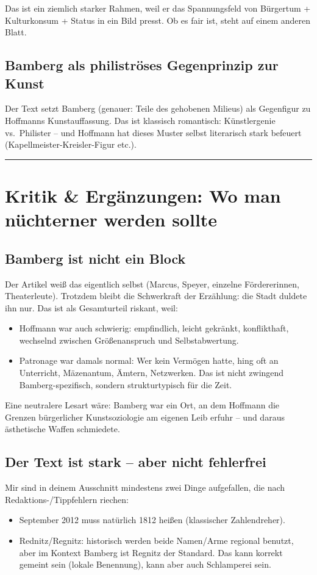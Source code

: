 \documentclass[11pt]{amsart}
\begin{document}
Das ist ein ziemlich starker Rahmen, weil er das Spannungsfeld von B\"urgertum + Kulturkonsum + Status in ein Bild presst. Ob es \glqq fair\grqq{} ist, steht auf einem anderen Blatt.

\subsection{Bamberg als \glqq philistr\"oses\grqq{} Gegenprinzip zur Kunst}
Der Text setzt Bamberg (genauer: Teile des gehobenen Milieus) als Gegenfigur zu Hoffmanns Kunstauffassung. Das ist klassisch romantisch: K\"unstlergenie vs.\ Philister -- und Hoffmann hat dieses Muster selbst literarisch stark befeuert (Kapellmeister-Kreisler-Figur etc.).

\bigskip
\hrule
\bigskip

\section{Kritik \& Erg\"anzungen: Wo man n\"uchterner werden sollte}

\subsection{\glqq Bamberg\grqq{} ist nicht ein Block}
Der Artikel wei{\ss} das eigentlich selbst (Marcus, Speyer, einzelne F\"ordererinnen, Theaterleute). Trotzdem bleibt die Schwerkraft der Erz\"ahlung: die Stadt duldete ihn nur. Das ist als Gesamturteil riskant, weil:
\begin{itemize}
  \item Hoffmann war auch schwierig: empfindlich, leicht gekr\"ankt, konflikthaft, wechselnd zwischen Gr\"o{\ss}enanspruch und Selbstabwertung.
  \item Patronage war damals normal: Wer kein Verm\"ogen hatte, hing oft an Unterricht, M\"azenantum, \"Amtern, Netzwerken. Das ist nicht zwingend \glqq Bamberg-spezifisch\grqq{}, sondern strukturtypisch f\"ur die Zeit.
\end{itemize}

Eine neutralere Lesart w\"are: Bamberg war ein Ort, an dem Hoffmann die Grenzen b\"urgerlicher Kunstsoziologie am eigenen Leib erfuhr -- und daraus \"asthetische Waffen schmiedete.

\subsection{Der Text ist stark -- aber nicht fehlerfrei}
Mir sind in deinem Ausschnitt mindestens zwei Dinge aufgefallen, die nach Redaktions-/Tippfehlern riechen:
\begin{itemize}
  \item \glqq September 2012\grqq{} muss nat\"urlich 1812 hei{\ss}en (klassischer Zahlendreher).
  \item \glqq Rednitz\grqq/\glqq Regnitz\grqq: historisch werden beide Namen/Arme regional benutzt, aber im Kontext Bamberg ist \glqq Regnitz\grqq{} der Standard. Das kann korrekt gemeint sein (lokale Benennung), kann aber auch Schlamperei sein.
\end{itemize}
\end{document}
